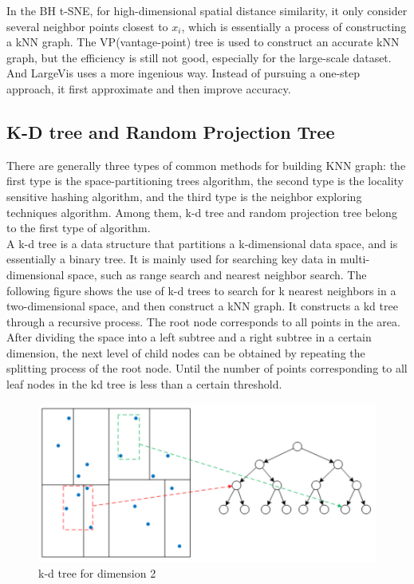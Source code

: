 In the BH t-SNE, for high-dimensional spatial distance similarity, it only consider several neighbor points closest to $x_i$, which is essentially a process of constructing a kNN graph. The VP(vantage-point) tree is used to construct an accurate kNN graph, but the efficiency is still not good, especially for the large-scale dataset. And LargeVis uses a more ingenious way. Instead of pursuing a one-step approach, it first approximate and then improve accuracy.\\

\subsection{K-D tree and Random Projection Tree}

There are generally three types of common methods for building KNN graph: the first type is the space-partitioning trees algorithm, the second type is the locality sensitive hashing algorithm, and the third type is the neighbor exploring techniques algorithm. Among them, k-d tree and random projection tree belong to the first type of algorithm.\\

\noindent A k-d tree is a data structure that partitions a k-dimensional data space, and is essentially a binary tree. It is mainly used for searching key data in multi-dimensional space, such as range search and nearest neighbor search. The following figure shows the use of k-d trees to search for k nearest neighbors in a two-dimensional space, and then construct a kNN graph. It constructs a kd tree through a recursive process. The root node corresponds to all points in the area. After dividing the space into a left subtree and a right subtree in a certain dimension, the next level of child nodes can be obtained by repeating the splitting process of the root node. Until the number of points corresponding to all leaf nodes in the kd tree is less than a certain threshold.\\

\begin{figure}[ht]

\centering
\includegraphics[scale=0.85]{images/image_largevis_k-d_tree_1.PNG}
\caption{k-d tree for dimension 2}
\label{fig:label}
\end{figure}

